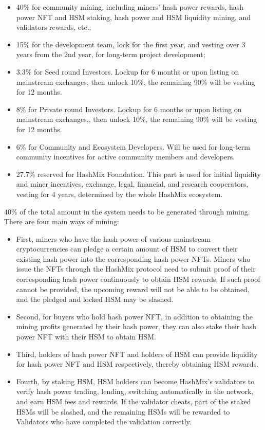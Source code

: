 \documentclass[]{template/llncs}
\begin{document}
\begin{itemize}
	\item 40\% for community mining, including miners' hash power rewards, hash power NFT and HSM staking, hash power and HSM liquidity mining, and validators rewards, etc.;
	\item 15\% for the development team, lock for the first year, and vesting over 3 years from the 2nd year, for long-term project development;
	\item 3.3\% for Seed round Investors. Lockup for 6 months or upon listing on mainstream exchanges, then unlock 10\%, the remaining 90\% will be vesting for 12 months.
	\item 8\% for Private round Investors. Lockup for 6 months or upon listing on mainstream exchanges,, then unlock 10\%, the remaining 90\% will be vesting for 12 months.
	\item 6\% for Community and Ecosystem Developers. Will be used for long-term community incentives for active community members and developers.
	\item 27.7\% reserved for HashMix Foundation. This part is used for initial liquidity and miner incentives, exchange, legal, financial, and research cooperators, vesting for 4 years, determined by the whole HashMix ecosystem.
\end{itemize}

40\% of the total amount in the system needs to be generated through mining. There are four main ways of mining:

\begin{itemize}
	\item First, miners who have the hash power of various mainstream cryptocurrencies can pledge a certain amount of HSM to convert their existing hash power into the corresponding hash power NFTs. Miners who issue the NFTs through the HashMix protocol need to submit proof of their corresponding hash power continuously to obtain HSM rewards. If such proof cannot be provided, the upcoming reward will not be able to be obtained, and the pledged and locked HSM may be slashed.
	\item Second, for buyers who hold hash power NFT, in addition to obtaining the mining profits generated by their hash power, they can also stake their hash power NFT with their HSM to obtain HSM.
	\item Third, holders of hash power NFT and holders of HSM can provide liquidity for hash power NFT and HSM respectively, thereby obtaining HSM rewards.
	\item Fourth, by staking HSM, HSM holders can become HashMix's validators to verify hash power trading, lending, switching automatically in the network, and earn HSM fees and rewards. If the validator cheats, part of the staked HSMs will be slashed, and the remaining HSMs will be rewarded to Validators who have completed the validation correctly.

\end{itemize}
\end{document}
